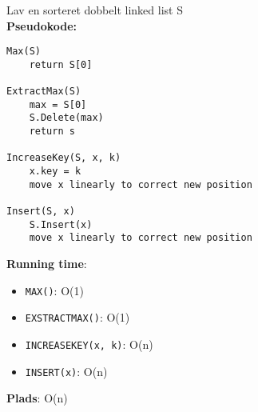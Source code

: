 Lav en sorteret dobbelt linked list S\\
\textbf{Pseudokode:}
\begin{lstlisting}[frame=single, mathescape=true]
Max(S)
	return S[0]

ExtractMax(S)
	max = S[0]
	S.Delete(max)
	return s

IncreaseKey(S, x, k)
	x.key = k
	move x linearly to correct new position

Insert(S, x)
	S.Insert(x)
	move x linearly to correct new position
\end{lstlisting}
\textbf{Running time}:
\begin{itemize}
	\item \texttt{MAX()}: O(1)
	\item \texttt{EXSTRACTMAX()}: O(1)
	\item \texttt{INCREASEKEY(x, k)}: O(n)
	\item \texttt{INSERT(x)}: O(n)
\end{itemize}
\textbf{Plads}: O(n)